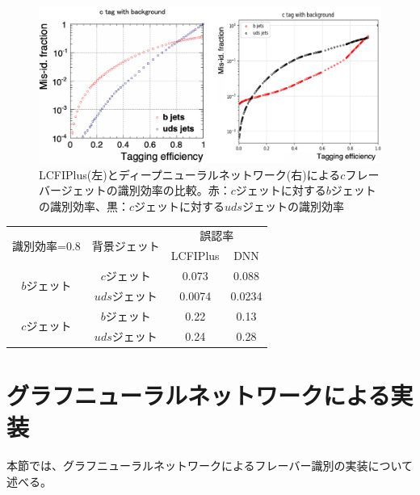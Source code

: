 \begin{figure}[H]
	\begin{center}
 \includegraphics[keepaspectratio, scale=0.38]
 	{Figure/Flavortagging/dnneff_c.png}
 		\caption[LCFIPlusとDNNのc-tagに関する比較]{LCFIPlus(左)とディープニューラルネットワーク(右)による$c$フレーバージェットの識別効率の比較。赤：$c$ジェットに対する$b$ジェットの識別効率、黒：$c$ジェットに対する$uds$ジェットの識別効率}
 		\label{dnneff_c}
	\end{center}
\end{figure}
\begin{table}[H]
 \centering
  \begin{tabular}{ |c|c|c|c|}
   \hline
   \multirow{2}{*}{識別効率=0.8} & \multirow{2}{*}{背景ジェット} & \multicolumn{2}{c|}{誤認率} \\ \cline{3-4} 
    & & LCFIPlus & DNN\\ \cline{3-4} 
    \hline
    \hline
   \multirow{2}{*}{$b$ジェット} & $c$ジェット & 0.073 & 0.088\\ \cline{2-4} 
   & $uds$ジェット & 0.0074 & 0.0234\\ \cline{1-4} 
   \multirow{2}{*}{$c$ジェット} & $b$ジェット & 0.22 & 0.13\\ \cline{2-4} 
   & $uds$ジェット & 0.24 & 0.28\\
   \hline
  \end{tabular}
  \label{dnneff80}
\end{table}

\newpage

\section{グラフニューラルネットワークによる実装}
本節では、グラフニューラルネットワークによるフレーバー識別の実装について述べる。
